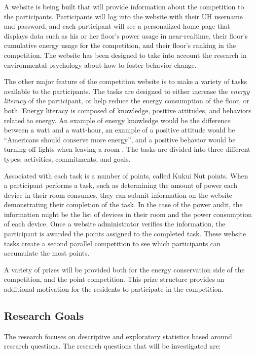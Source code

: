 A website is being built that will provide information about the competition to the participants. Participants will log into the website with their UH username and password, and each participant will see a personalized home page that displays data such as his or her floor's power usage in near-realtime, their floor's cumulative energy usage for the competition, and their floor's ranking in the competition. The website has been designed to take into account the research in environmental psychology about how to foster behavior change.

The other major feature of the competition website is to make a variety of tasks available to the participants. The tasks are designed to either increase the \emph{energy literacy} of the participant, or help reduce the energy consumption of the floor, or both. Energy literacy is composed of knowledge, positive attitudes, and behaviors related to energy. An example of energy knowledge would be the difference between a watt and a watt-hour, an example of a positive attitude would be ``Americans should conserve more energy'', and a positive behavior would be turning off lights when leaving a room \cite{DeWaters09c}. The tasks are divided into three different types: activities, commitments, and goals. 

Associated with each task is a number of points, called Kukui Nut points. When a participant performs a task, such as determining the amount of power each device in their room consumes, they can submit information on the website demonstrating their completion of the task. In the case of the power audit, the information might be the list of devices in their room and the power consumption of each device. Once a website administrator verifies the information, the participant is awarded the points assigned to the completed task. These website tasks create a second parallel competition to see which participants can accumulate the most points.

A variety of prizes will be provided both for the energy conservation side of the competition, and the point competition. This prize structure provides an additional motivation for the residents to participate in the competition.

\subsection{Research Goals}

The research focuses on descriptive and exploratory statistics based around research questions. The research questions that will be investigated are:


